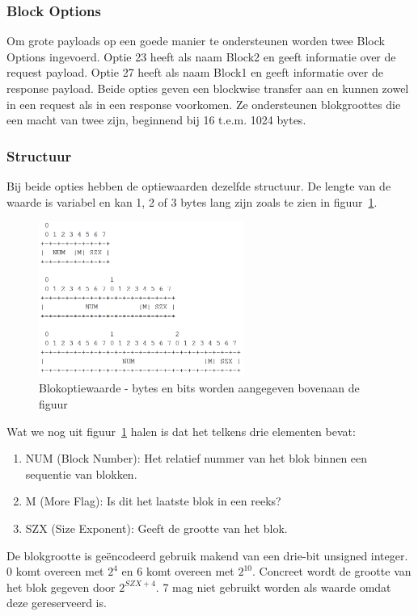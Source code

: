 \subsubsection{Block Options}
Om grote payloads op een goede manier te ondersteunen worden twee Block Options ingevoerd. Optie 23 heeft als naam Block2 en geeft informatie over de request payload. Optie 27 heeft als naam Block1 en geeft informatie over de response payload. Beide opties  geven een blockwise transfer aan en kunnen zowel in een request als in een response voorkomen. Ze ondersteunen blokgroottes die een macht van twee zijn, beginnend bij 16 t.e.m. 1024 bytes.

\subsubsection{Structuur}
Bij beide opties hebben de optiewaarden dezelfde structuur. De lengte van de waarde is variabel en kan 1, 2 of 3 bytes lang zijn zoals te zien in figuur~\ref{fig:blockOption}.
\begin{figure}[h]
\centering
\includegraphics[width=0.6\textwidth]{fig/blockOption}
\caption{Blokoptiewaarde - bytes en bits worden aangegeven bovenaan de figuur}
\label{fig:blockOption}
\end{figure}

\noindent
Wat we nog uit figuur~\ref{fig:blockOption} halen is dat het telkens drie elementen bevat:
\begin{enumerate}
\item NUM (Block Number): Het relatief nummer van het blok binnen een sequentie van blokken.
\item M (More Flag): Is dit het laatste blok in een reeks?
\item SZX (Size Exponent): Geeft de grootte van het blok.
\end{enumerate}

\noindent
De blokgrootte is ge\"{e}ncodeerd gebruik makend van een drie-bit unsigned integer. 0 komt overeen met $ 2^{4} $ en 6 komt overeen met  $ 2^{10} $. Concreet wordt de grootte van het blok gegeven door  $ 2^{ SZX + 4} $. 7 mag niet gebruikt worden als waarde omdat deze gereserveerd is.

